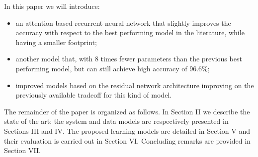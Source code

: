 In this paper we will introduce:
\begin{itemize}
  \item an attention-based recurrent neural network that slightly improves the accuracy with respect to the best performing model in the literature, while having a smaller footprint; 

  \item another model that, with 8 times fewer parameters than the previous best performing model, but can still achieve high accuracy of 96.6\%;
  \item improved models based on the residual network architecture improving on the previously available tradeoff for this kind of model.

\end{itemize}


The remainder of the paper is organized as follows. In Section II we describe the state of the art; the system and data models are respectively presented in Sections III and IV. The proposed learning models are detailed in Section V and their evaluation is carried out in Section VI.
Concluding remarks are provided in Section VII.
